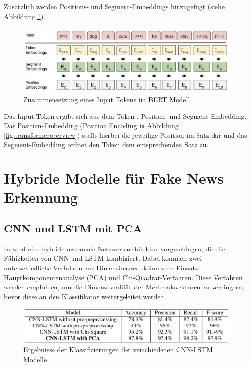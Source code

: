 Zusätzlich werden Positions- und Segment-Embeddings hinzugefügt (siehe Abbildung \ref{fig:bert_tokenizierung}).

\begin{figure}[htbp]
    \begin{center}
        \includegraphics[scale=0.4]{static/bert_tokenizierung.png}
        \caption{\label{fig:bert_tokenizierung} Zusammensetzung eines Input Tokens im BERT Modell \cite{devlin2019}}
    \end{center}
\end{figure}

Das Input Token ergibt sich aus dem Token-, Position- und Segment-Embedding. Das Position-Embedding (Position Encoding in Abbildung \ref{fig:transformeroverview}) 
stellt hierbei die jeweilige Position im Satz dar und das Segment-Embedding ordnet den Token dem entsprechenden Satz zu.

\section{Hybride Modelle für Fake News Erkennung}
\label{sec:hybride_modelle}

\subsection{CNN und LSTM mit PCA}

In \cite{umer2020} wird eine hybride neuronale Netzwerkarchitektur vorgeschlagen, die die Fähigkeiten von CNN und 
LSTM kombiniert. Dabei kommen zwei unterschiedliche Verfahren zur Dimensionsreduktion zum Einsatz: 
Hauptkomponentenanalyse (PCA) und Chi-Quadrat-Verfahren. 
Diese Verfahren werden empfohlen, um die Dimensionalität der 
Merkmalsvektoren zu verringern, bevor diese an den Klassifikator weitergeleitet werden.

\begin{figure}[htbp]
    \begin{center}
    \includegraphics[scale=0.4]{static/cnn_lstm_pca.png}
    \caption{\label{fig:cnn_lstm_pca} Ergebnisse der Klassifizierungen der verschiedenen CNN-LSTM Modelle \cite{umer2020}}
    \end{center}
\end{figure}

